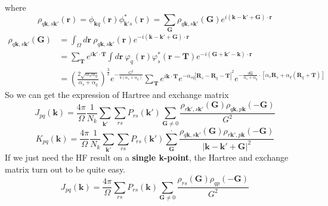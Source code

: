 \documentclass{article}
\begin{document}
            where
            \begin{equation}
                \rho_{q\textbf{k},s\textbf{k}'}(\textbf{r}) = \phi_{\textbf{k}q}(\textbf{r})\phi_{\textbf{k}'s}^*(\textbf{r}) 
                = \sum_{\textbf{G}}\rho_{q\textbf{k},s\textbf{k}'}(\textbf{G})e^{i(\textbf{k}-\textbf{k}'+\textbf{G})\cdot\textbf{r}}
            \end{equation}
            \begin{align}
                \rho_{q\textbf{k},s\textbf{k}'}(\textbf{G}) &= \int_{\Omega}d\textbf{r}\ \rho_{q\textbf{k},s\textbf{k}'}(\textbf{r})
                e^{-i(\textbf{k}-\textbf{k}'+\textbf{G})\cdot\textbf{r}}\\
                & = \sum_{\textbf{T}}e^{i\textbf{k}'\cdot\textbf{T}}\int d\textbf{r}\ \varphi_q(\textbf{r})
                \varphi_s^*(\textbf{r}-\textbf{T})e^{-i(\textbf{G}+\textbf{k}'-\textbf{k})\cdot\textbf{r}}\\
                & = \left(\frac{2\sqrt{\alpha_s\alpha_q}}{\alpha_s+\alpha_q}\right)^{\frac{3}{2}}e^{-\frac{G^2}{4(\alpha_s+\alpha_q)}}
                \sum_{\textbf{T}}e^{i\textbf{k}\cdot\textbf{T}}e^{-\alpha_{sq}|\textbf{R}_s-\textbf{R}_q-\textbf{T}|^2}
                e^{-\frac{i\textbf{G}}{\alpha_s+\alpha_q}\cdot\left[\alpha_s\textbf{R}_s+\alpha_q(\textbf{R}_q+\textbf{T})\right]}
            \end{align}
            So we can get the expression of Hartree and exchange matrix
            \begin{equation}
                J_{pq}(\textbf{k}) = \frac{4\pi}{\Omega}\frac{1}{N_k}\sum_{\textbf{k}'}\sum_{rs}
                P_{rs}(\textbf{k}')\sum_{\textbf{G}\neq 0}\frac{\rho_{r\textbf{k}',s\textbf{k}'}(\textbf{G})\rho_{q\textbf{k},p\textbf{k}}(-\textbf{G})}{G^2}
            \end{equation}
            \begin{equation}
                K_{pq}(\textbf{k}) = \frac{4\pi}{\Omega}\frac{1}{N_k}\sum_{\textbf{k}'}\sum_{rs}P_{rs}(\textbf{k}')
                \sum_{\textbf{G}}^{,}\frac{\rho_{q\textbf{k},s\textbf{k}'}(\textbf{G})
                \rho_{r\textbf{k}',p\textbf{k}}(-\textbf{G})}{\left|\textbf{k}-\textbf{k}'+\textbf{G}\right|^2}
            \end{equation}
            If we just need the HF result on a \textbf{single k-point},
            the Hartree and exchange matrix turn out to be quite easy.
            \begin{equation}
                J_{pq}(\textbf{k}) = \frac{4\pi}{\Omega}\sum_{rs}P_{rs}(\textbf{k})
                \sum_{\textbf{G}\neq 0}\frac{\rho_{rs}(\textbf{G})\rho_{qp}(-\textbf{G})}{G^2}
            \end{equation}
\end{document}
